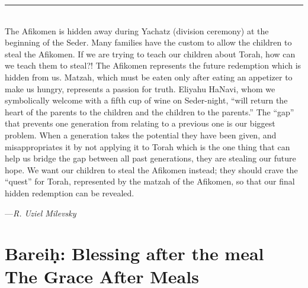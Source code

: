 \documentclass[letter,11pt,openany]{memoir}
\newcommand{\HgInst}[1]{{
\noindent\sffamily{\bfseries{#1}}}}
\newcommand{\HgSource}[1]{\hfill{\small---\itshape{#1}}}
\newcommand{\HgFill}{
\vfill \hrule 
\vfill}
\newenvironment{HgEnglish}{\strut\\
\noindent}{\vspace{1em}}
\begin{document}
\HgFill
\begin{HgEnglish}
	The Afikomen is hidden away during Yachatz (division ceremony) at the beginning of the Seder. Many families have the custom to allow the children to steal the Afikomen. If we are trying to teach our children about Torah, how can we teach them to steal?! The Afikomen represents the future redemption which is hidden from us. Matzah, which must be eaten only after eating an appetizer to make us hungry, represents a passion for truth. Eliyahu HaNavi, whom we symbolically welcome with a fifth cup of wine on Seder-night, ``will return the heart of the parents to the children and the children to the parents.'' The ``gap'' that prevents one generation from relating to a previous one is our biggest problem. When a generation takes the potential they have been given, and misappropriates it by not applying it to Torah which is the one thing that can help us bridge the gap between all past generations, they are stealing our future hope. We want our children to steal the Afikomen instead; they should crave the ``quest'' for Torah, represented by the matzah of the Afikomen, so that our final hidden redemption can be revealed. 
	
	\HgSource{R. Uziel Milevsky} 
\end{HgEnglish}

\chapter*{Barei\d{h}: Blessing after the meal \\
{\LARGE The Grace After Meals}}

\vfill

\HgInst{Pour the third cup of wine.}\\
\end{document}
